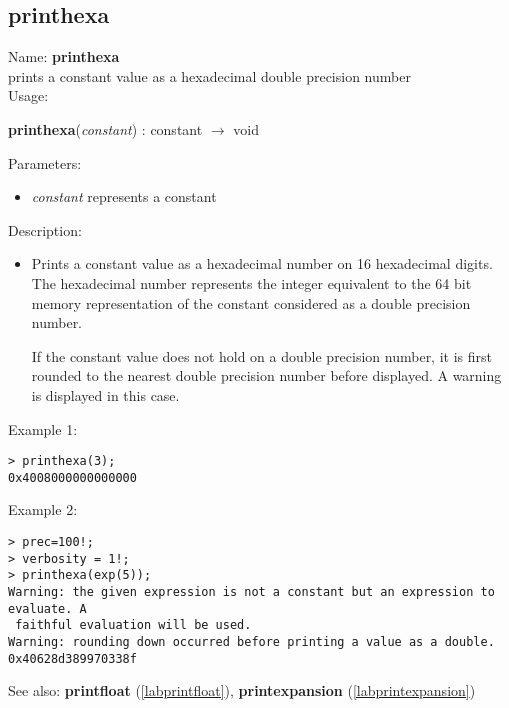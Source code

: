 \subsection{printhexa}
\label{labprinthexa}
\noindent Name: \textbf{printhexa}\\
prints a constant value as a hexadecimal double precision number\\
\noindent Usage: 
\begin{center}
\textbf{printhexa}(\emph{constant}) : \textsf{constant} $\rightarrow$ \textsf{void}
\end{center}
Parameters: 
\begin{itemize}
\item \emph{constant} represents a constant
\end{itemize}
\noindent Description: \begin{itemize}

\item Prints a constant value as a hexadecimal number on 16 hexadecimal
   digits. The hexadecimal number represents the integer equivalent to
   the 64 bit memory representation of the constant considered as a
   double precision number.
    
   If the constant value does not hold on a double precision number, it
   is first rounded to the nearest double precision number before
   displayed. A warning is displayed in this case.
\end{itemize}
\noindent Example 1: 
\begin{center}\begin{minipage}{15cm}\begin{Verbatim}[frame=single]
> printhexa(3);
0x4008000000000000
\end{Verbatim}
\end{minipage}\end{center}
\noindent Example 2: 
\begin{center}\begin{minipage}{15cm}\begin{Verbatim}[frame=single]
> prec=100!;
> verbosity = 1!;
> printhexa(exp(5));
Warning: the given expression is not a constant but an expression to evaluate. A
 faithful evaluation will be used.
Warning: rounding down occurred before printing a value as a double.
0x40628d389970338f
\end{Verbatim}
\end{minipage}\end{center}
See also: \textbf{printfloat} (\ref{labprintfloat}), \textbf{printexpansion} (\ref{labprintexpansion})

